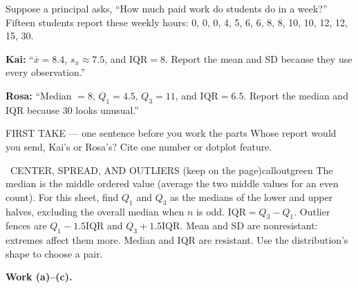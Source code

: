 \documentclass[11pt]{article}
\begin{document}


Suppose a principal asks, ``How much paid work do students do in a week?'' Fifteen students report these weekly hours: 0, 0, 0, 4, 5, 6, 6, 8, 8, 10, 10, 12, 12, 15, 30.\par\smallskip \textbf{Kai:} ``$\bar{x}=8.4$, $s_x\approx7.5$, and $\mathrm{IQR}=8$. Report the mean and SD because they use every observation.''\par \textbf{Rosa:} ``Median $=8$, $Q_1=4.5$, $Q_3=11$, and $\mathrm{IQR}=6.5$. Report the median and IQR because 30 looks unusual.''\par
\begin{center}
\end{center}
\begin{firsttakebox}{FIRST TAKE --- one sentence before you work the parts}
Whose report would you send, Kai's or Rosa's? Cite one number or dotplot feature.
\workspace{0.9in}
\end{firsttakebox}

\begin{callout}{\IconBook\ CENTER, SPREAD, AND OUTLIERS (keep on the page)}{calloutgreen}
The median is the middle ordered value (average the two middle values for an even count). For this sheet, find $Q_1$ and $Q_3$ as the medians of the lower and upper halves, excluding the overall median when $n$ is odd. $\mathrm{IQR}=Q_3-Q_1$. Outlier fences are $Q_1-1.5\mathrm{IQR}$ and $Q_3+1.5\mathrm{IQR}$. Mean and SD are nonresistant: extremes affect them more. Median and IQR are resistant. Use the distribution's shape to choose a pair.
\end{callout}

\newpage
\textbf{Work (a)--(c).}\par\smallskip
\end{document}
